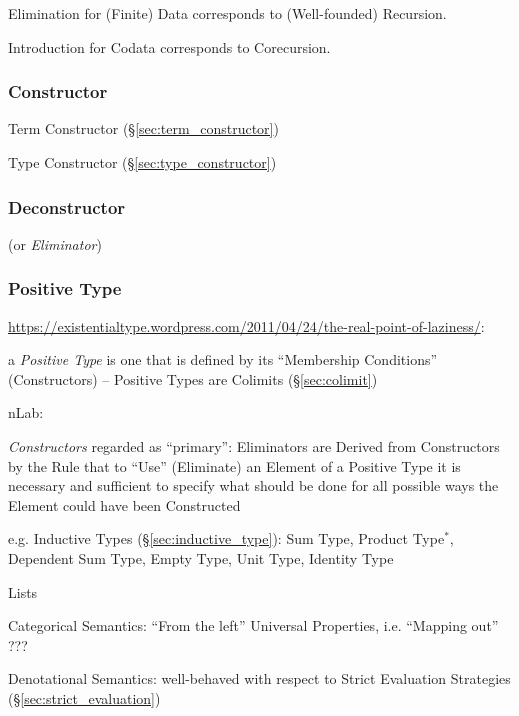 Elimination for (Finite) Data corresponds to (Well-founded)
Recursion.

Introduction for Codata corresponds to Corecursion.




\subsubsection{Constructor}\label{sec:constructor}

Term Constructor (\S\ref{sec:term_constructor})

Type Constructor (\S\ref{sec:type_constructor})



\subsubsection{Deconstructor}\label{sec:deconstructor}

(or \emph{Eliminator})



\subsubsection{Positive Type}\label{sec:positive_type}

\url{https://existentialtype.wordpress.com/2011/04/24/the-real-point-of-laziness/}:

a \emph{Positive Type} is one that is defined by its ``Membership
Conditions'' (Constructors) -- Positive Types are Colimits
(\S\ref{sec:colimit})

nLab:

\emph{Constructors} regarded as ``primary'': Eliminators are Derived
from Constructors by the Rule that to ``Use'' (Eliminate) an Element
of a Positive Type it is necessary and sufficient to specify what
should be done for all possible ways the Element could have been
Constructed

e.g. Inductive Types (\S\ref{sec:inductive_type}): Sum Type, Product
Type$^*$, Dependent Sum Type, Empty Type, Unit Type, Identity Type

Lists

Categorical Semantics: ``From the left'' Universal Properties, i.e.
``Mapping out'' ???

Denotational Semantics: well-behaved with respect to Strict Evaluation
Strategies (\S\ref{sec:strict_evaluation})



